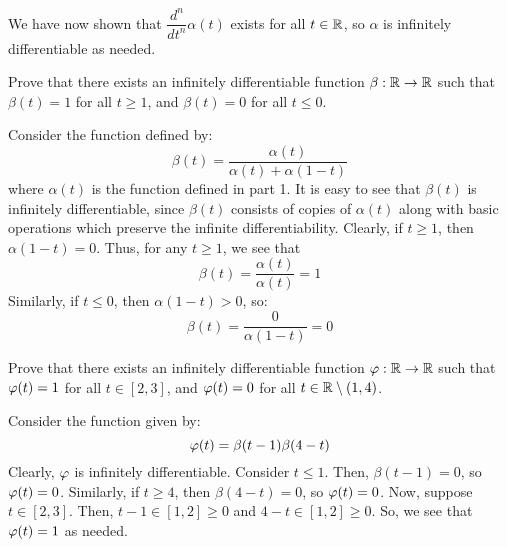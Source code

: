 \documentclass{article}
\begin{document}
\begin{soln}
    We have now shown that $ \dfrac{d^{n}}{dt^{n}} \alpha(t) $ exists for all $ t \in \mathbb{R} $,
    so $ \alpha $ is infinitely differentiable as needed.
\end{soln}

\begin{qu}
    Prove that there exists an infinitely differentiable function
    $ \beta: \mathbb{R} \rightarrow \mathbb{R} $ such that $ \beta(t) = 1 $ for all $ t \geq 1 $,
    and $ \beta(t) = 0 $ for all $ t \leq 0 $.
\end{qu}

\begin{soln}
    Consider the function defined by:
    \begin{equation*}
        \beta(t) = \frac{\alpha(t)}{\alpha(t) + \alpha(1-t)}
    \end{equation*}
    where $ \alpha(t) $ is the function defined in part 1. \vsp
    It is easy to see that $ \beta(t) $ is infinitely differentiable,
    since $ \beta(t) $ consists of copies of $ \alpha(t) $ along with basic operations
    which preserve the infinite differentiability. \vsp
    Clearly, if $ t \geq 1 $, then $ \alpha(1 - t) = 0 $. Thus, for any $ t \geq 1 $, we see that
    \begin{equation*}
        \beta(t) = \frac{\alpha(t)}{\alpha(t)} = 1
    \end{equation*}
    Similarly, if $ t \leq 0 $, then $ \alpha(1 - t) > 0 $, so:
    \begin{equation*}
        \beta(t) = \frac{0}{\alpha(1 - t)} = 0
    \end{equation*}
\end{soln}

\begin{qu}
    Prove that there exists an infinitely differentiable function
    $ \operatorname{\varphi}: \mathbb{R} \rightarrow \mathbb{R} $ such that $ \operatorname{\varphi}(t) = 1 $ for all $ t \in [2, 3] $,
    and $ \operatorname{\varphi}(t) = 0 $ for all $ t \in \mathbb{R} \setminus (1, 4) $.
\end{qu}

\begin{soln}
    Consider the function given by:
    \begin{equation*}
        \operatorname{\varphi}(t) = \beta(t - 1)\beta(4 - t)
    \end{equation*}
    Clearly, $ \operatorname{\varphi} $ is infinitely differentiable. \vsp
    Consider $ t \leq 1 $. Then, $ \beta(t - 1) = 0 $, so $ \operatorname{\varphi}(t) = 0 $.
    Similarly, if $ t \geq 4 $, then $ \beta(4 - t) = 0 $, so $ \operatorname{\varphi}(t) = 0 $. \vsp
    Now, suppose $ t \in [2, 3] $. Then, $ t - 1 \in [1, 2] \geq 0 $ and $ 4 - t \in [1, 2] \geq 0 $.
    So, we see that $ \operatorname{\varphi}(t) = 1 $ as needed.
\end{soln}
\end{document}

